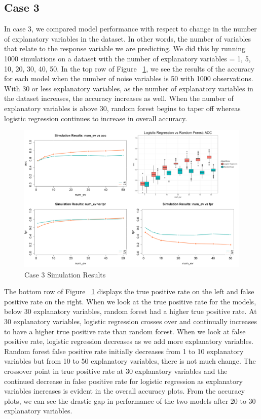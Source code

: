\documentclass{llncs}
\begin{document}
\subsection{Case 3}

In case 3, we compared model performance with respect to change in the number of explanatory variables in the dataset.  In other words, the number of variables that relate to the response variable we are predicting. We did this by running 1000 simulations on a dataset with the number of explanatory variables = 1, 5, 10, 20, 30, 40, 50.  In the top row of Figure ~\ref{fig:case3results}, we see the results of the accuracy for each model when the number of noise variables is 50 with 1000 observations.  With 30 or less explanatory variables, as the number of explanatory variables in the dataset increases, the accuracy increases as well.  When the number of explanatory variables is above 30, random forest begins to taper off whereas logistic regression continues to increase in overall accuracy. 

\begin{figure}
\centering
\includegraphics[scale=0.55]{case3.png}
\caption{Case 3 Simulation Results}
\label{fig:case3results}
\end{figure}

The bottom row of Figure ~\ref{fig:case3results} displays the true positive rate on the left and false positive rate on the right.  When we look at the true positive rate for the models, below 30 explanatory variables, random forest had a higher true positive rate.  At 30 explanatory variables, logistic regression crosses over and continually increases to have a higher true positive rate than random forest.  When we look at false positive rate, logistic regression decreases as we add more explanatory variables.  Random forest false positive rate initially decreases from 1 to 10 explanatory variables but from 10 to 50 explanatory variables, there is not much change.  The crossover point in true positive rate at 30 explanatory variables and the continued decrease in false positive rate for logistic regression as explanatory variables increases is evident in the overall accuracy plots.  From the accuracy plots, we can see the drastic gap in performance of the two models after 20 to 30 explanatory variables.
\end{document}
